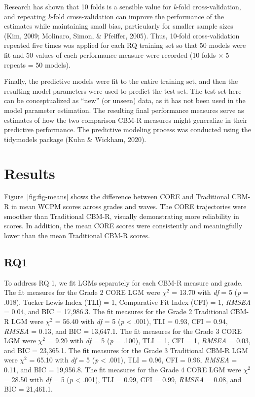 \documentclass[
  english,
  man, fleqn, noextraspace]{apa6}
\begin{document}
Research has shown that 10 folds is a sensible value for \emph{k}-fold cross-validation, and repeating \emph{k}-fold cross-validation can improve the performance of the estimates while maintaining small bias, particularly for smaller sample sizes (Kim, 2009; Molinaro, Simon, \& Pfeiffer, 2005). Thus, 10-fold cross-validation repeated five times was applied for each RQ training set so that 50 models were fit and 50 values of each performance measure were recorded (10 folds \(\times\) 5 repeats = 50 models).

Finally, the predictive models were fit to the entire training set, and then the resulting model parameters were used to predict the test set. The test set here can be conceptualized as ``new'' (or unseen) data, as it has not been used in the model parameter estimation. The resulting final performance measures serve as estimates of how the two comparison CBM-R measures might generalize in their predictive performance. The predictive modeling process was conducted using the tidymodels package (Kuhn \& Wickham, 2020).

\hypertarget{results}{%
\section{Results}\label{results}}

Figure~\ref{fig:fig-means} shows the difference between CORE and Traditional CBM-R in mean WCPM scores across grades and waves. The CORE trajectories were smoother than Traditional CBM-R, visually demonstrating more reliability in scores. In addition, the mean CORE scores were consistently and meaningfully lower than the mean Traditional CBM-R scores.

\hypertarget{rq1}{%
\subsection{RQ1}\label{rq1}}

To address RQ 1, we fit LGMs separately for each CBM-R measure and grade. The fit measures for the Grade 2 CORE LGM were \(\chi^2\) = 13.70 with \emph{df} = 5 (\emph{p} = .018), Tucker Lewis Index (TLI) = 1, Comparative Fit Index (CFI) = 1, \emph{RMSEA} = 0.04, and BIC = 17,986.3. The fit measures for the Grade 2 Traditional CBM-R LGM were \(\chi^2\) = 56.40 with \emph{df} = 5 (\emph{p} \textless{} .001), TLI = 0.93, CFI = 0.94, \emph{RMSEA} = 0.13, and BIC = 13,647.1. The fit measures for the Grade 3 CORE LGM were \(\chi^2\) = 9.20 with \emph{df} = 5 (\emph{p} = .100), TLI = 1, CFI = 1, \emph{RMSEA} = 0.03, and BIC = 23,365.1. The fit measures for the Grade 3 Traditional CBM-R LGM were \(\chi^2\) = 65.10 with \emph{df} = 5 (\emph{p} \textless{} .001), TLI = 0.96, CFI = 0.96, \emph{RMSEA} = 0.11, and BIC = 19,956.8. The fit measures for the Grade 4 CORE LGM were \(\chi^2\) = 28.50 with \emph{df} = 5 (\emph{p} \textless{} .001), TLI = 0.99, CFI = 0.99, \emph{RMSEA} = 0.08, and BIC = 21,461.1.
\end{document}
